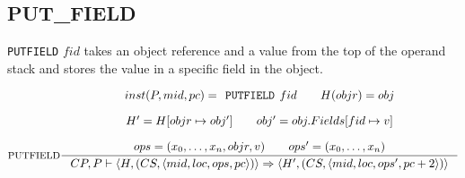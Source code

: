 \subsection{PUT\_FIELD}
\texttt{PUTFIELD} $fid$ takes an object reference and a value from the top of the operand stack and stores the value in a specific field in the object.

$$\inference[PUTFIELD]{
inst(P,mid, pc) = \texttt{PUTFIELD } fid \semsp
H(objr) = obj \semnl \\
H' = H[objr \mapsto obj'] \semsp 
obj' = obj.Fields[fid \mapsto v] \semnl\\
ops = (x_0, \ldots, x_n, objr, v) \semsp
ops' = (x_0, \ldots, x_{n})}
{CP, P \vdash \langle H, (CS, \langle mid, loc, ops, pc \rangle )\rangle \Rightarrow \langle H', (CS, \langle mid, loc, ops', pc + 2 \rangle )\rangle}$$